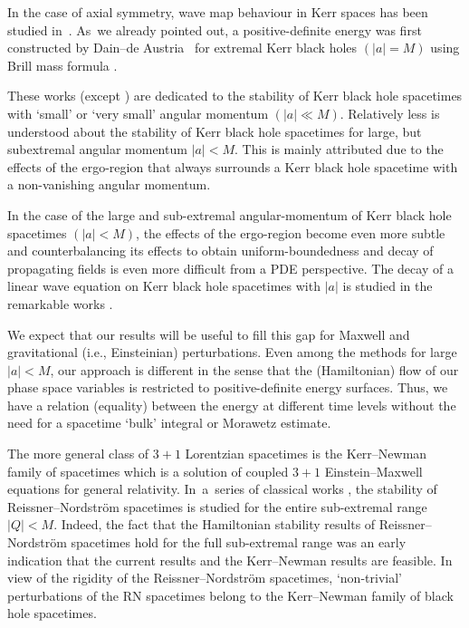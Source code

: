 \documentclass[11pt]{article}
\numberwithin{equation}{section}
\numberwithin{equation}{section}
\begin{document}
In the case of axial symmetry, wave map behaviour in Kerr spaces has been studied in~\cite{IK_15}. As~we already pointed out, a positive-definite energy was first constructed by Dain--de Austria~\cite{DA_14} for extremal Kerr black holes $(\vert a \vert =M)$ using Brill mass formula \cite{B59, D09}.

 These works (except \cite{DA_14}) are dedicated to the stability of Kerr black hole spacetimes with `small' or `very small' angular momentum $(\vert a \vert \ll M)$. Relatively less is understood about the stability of Kerr black hole spacetimes for large, but subextremal angular momentum $ \vert a \vert<M$. This is mainly attributed due to the effects of the ergo-region that always surrounds a Kerr black hole spacetime with a non-vanishing angular momentum.

In the case of the large and sub-extremal angular-momentum of Kerr black hole spacetimes $ (\vert a \vert <M)$, the effects of the ergo-region become even more subtle and counterbalancing its effects to obtain uniform-boundedness and decay of propagating fields is even more difficult from a PDE perspective.
The decay of a linear wave equation on Kerr black hole spacetimes with $\vert a \vert$ is studied in the remarkable works \cite{DRS_16, FKSY_05,FKSY_06,FKSY_08}.

 We expect that our results will be useful to fill this gap for Maxwell and gravitational (i.e., Einsteinian) perturbations. Even among the methods for large $\vert a \vert<M$, our approach is different in the sense that the (Hamiltonian) flow of our phase space variables is restricted to positive-definite energy surfaces. Thus, we have a relation (equality) between the energy at different time levels without the need for a spacetime `bulk' integral or Morawetz estimate.

The more general class of $3+1$ Lorentzian spacetimes is the Kerr--Newman family of spacetimes which is a solution of coupled $3+1$ Einstein--Maxwell equations for general relativity. In~a~series of classical works \cite{Moncrief_74_1,Moncrief_74_2,Moncrief_74_3}, the stability of Reissner--Nordstr\"om spacetimes is studied for the entire sub-extremal range $\vert Q \vert <M$. Indeed, the fact that the Hamiltonian stability results of Reissner--Nordstr\"om spacetimes hold for the full sub-extremal range was an early indication that the current results and the Kerr--Newman results \cite{GM17_gentitle} are feasible. In view of the rigidity of the Reissner--Nordstr\"om spacetimes, `non-trivial' perturbations of the RN spacetimes belong to the Kerr--Newman family of black hole spacetimes.
\end{document}
